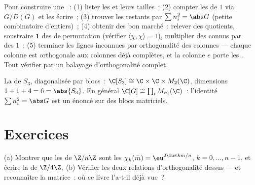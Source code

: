 \begin{method}\label{met:b3:representations:table}
Pour construire une ~: (1) lister les
 et leurs tailles~; (2) compter les
 de  $1$ via $G/D(G)$ et les écrire~; (3)
trouver les  restants par $\sum n_i^2 = \abs G$ (petite
combinatoire d'entiers)~; (4) obtenir des 
bon marché~: relever des quotients, soustraire $\mathbf 1$ des
 de permutation (vérifier $\langle\chi,\chi\rangle =
1$), multiplier des  connus par des  $1$~; (5)
terminer les lignes inconnues par orthogonalité des colonnes
--- chaque colonne est orthogonale aux colonnes déjà
complètes, et la colonne $e$ porte les . Tout vérifier
par un balayage d'orthogonalité complet.
\end{method}

\begin{omfigure}

{\small La  de $S_3$, diagonalisée par
blocs~: $\C[S_3] \cong \C \times \C \times M_2(\C)$, dimensions
$1 + 1 + 4 = 6 = \abs{S_3}$. En général $\C[G] \cong \prod_i
M_{n_i}(\C)$~: l'identité $\sum n_i^2 = \abs G$ est un énoncé
sur des blocs matriciels.}
\end{omfigure}

\section{Exercices}

\begin{exercise}[$\star$]\label{exo:b3:representations:1}
(a) Montrer que les   de $\Z/n\Z$ sont
les $\chi_k(\bar m) = \eu^{2\iu\pi km/n}$, $k = 0, \dots, n-1$,
et écrire la  de $\Z/4\Z$.
(b) Vérifier les deux relations d'orthogonalité dessus --- et
reconnaître la matrice~: où ce livre l'a-t-il déjà vue~?
\end{exercise}

